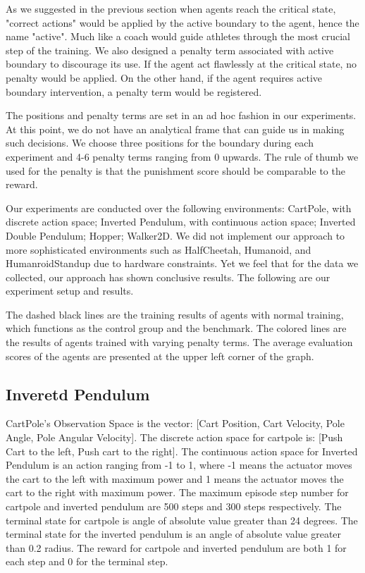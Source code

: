 \documentclass[journal]{IEEEtran}
\begin{document}
As we suggested in the previous section when agents reach the critical state, "correct actions" would be applied by the active boundary to the agent, hence the name "active". Much like a coach would guide athletes through the most crucial step of the training. We also designed a penalty term associated with active boundary to discourage its use. If the agent act flawlessly at the critical state, no penalty would be applied. On the other hand, if the agent requires active boundary intervention, a penalty term would be registered. 

The positions and penalty terms are set in an ad hoc fashion in our experiments. At this point, we do not have an analytical frame that can guide us in making such decisions. We choose three positions for the boundary during each experiment and 4-6 penalty terms ranging from 0 upwards. The rule of thumb we used for the penalty is that the punishment score should be comparable to the reward.

Our experiments are conducted over the following environments: CartPole, with discrete action space; Inverted Pendulum, with continuous action space; Inverted Double Pendulum; Hopper; Walker2D. We did not implement our approach to more sophisticated environments such as HalfCheetah, Humanoid, and HumanroidStandup due to hardware constraints. Yet we feel that for the data we collected, our approach has shown conclusive results. The following are our experiment setup and results.

The dashed black lines are the training results of agents with normal training, which functions as the control group and the benchmark. The colored lines are the results of agents trained with varying penalty terms. The average evaluation scores of the agents are presented at the upper left corner of the graph.

\subsection{Inveretd Pendulum}
CartPole's Observation Space is the vector: [Cart Position, Cart Velocity, Pole Angle, Pole Angular Velocity]. The discrete action space for cartpole is: [Push Cart to the left, Push cart to the right]. The continuous action space for Inverted Pendulum is an action ranging from -1 to 1, where -1 means the actuator moves the cart to the left with maximum power and 1 means the actuator moves the cart to the right with maximum power. The maximum episode step number for cartpole and inverted pendulum are 500 steps and 300 steps respectively. The terminal state for cartpole is angle of absolute value greater than 24 degrees. The terminal state for the inverted pendulum is an angle of absolute value greater than 0.2 radius. The reward for cartpole and inverted pendulum are both 1 for each step and 0 for the terminal step. 
\end{document}
